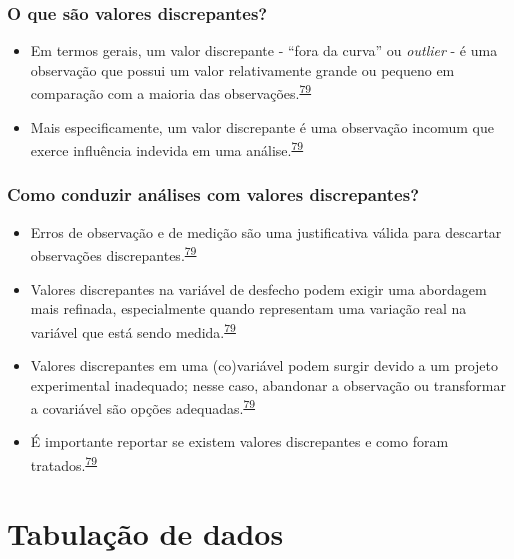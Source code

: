 \documentclass[
  a4paper,
]{book}
\begin{document}
\hypertarget{o-que-suxe3o-valores-discrepantes}{%
\subsection{O que são valores discrepantes?}\label{o-que-suxe3o-valores-discrepantes}}

\begin{itemize}
\item
  Em termos gerais, um valor discrepante - ``fora da curva'' ou \emph{outlier} - é uma observação que possui um valor relativamente grande ou pequeno em comparação com a maioria das observações.\textsuperscript{\protect\hyperlink{ref-zuur2009}{79}}
\item
  Mais especificamente, um valor discrepante é uma observação incomum que exerce influência indevida em uma análise.\textsuperscript{\protect\hyperlink{ref-zuur2009}{79}}
\end{itemize}

\hypertarget{como-conduzir-anuxe1lises-com-valores-discrepantes}{%
\subsection{Como conduzir análises com valores discrepantes?}\label{como-conduzir-anuxe1lises-com-valores-discrepantes}}

\begin{itemize}
\item
  Erros de observação e de medição são uma justificativa válida para descartar observações discrepantes.\textsuperscript{\protect\hyperlink{ref-zuur2009}{79}}
\item
  Valores discrepantes na variável de desfecho podem exigir uma abordagem mais refinada, especialmente quando representam uma variação real na variável que está sendo medida.\textsuperscript{\protect\hyperlink{ref-zuur2009}{79}}
\item
  Valores discrepantes em uma (co)variável podem surgir devido a um projeto experimental inadequado; nesse caso, abandonar a observação ou transformar a covariável são opções adequadas.\textsuperscript{\protect\hyperlink{ref-zuur2009}{79}}
\item
  É importante reportar se existem valores discrepantes e como foram tratados.\textsuperscript{\protect\hyperlink{ref-zuur2009}{79}}
\end{itemize}

\hypertarget{tabulacao-dados}{%
\chapter{\texorpdfstring{\textbf{Tabulação de dados}}{Tabulação de dados}}\label{tabulacao-dados}}
\end{document}
